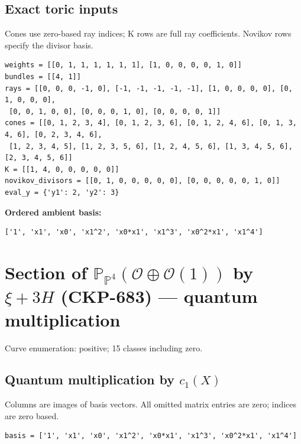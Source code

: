\documentclass[10pt,a4paper]{article}
\begin{document}
\subsection*{Exact toric inputs}
Cones use zero-based ray indices; K rows are full ray coefficients. Novikov rows specify the divisor basis.

\begin{lstlisting}
weights = [[0, 1, 1, 1, 1, 1, 1], [1, 0, 0, 0, 0, 1, 0]]
bundles = [[4, 1]]
rays = [[0, 0, 0, -1, 0], [-1, -1, -1, -1, -1], [1, 0, 0, 0, 0], [0, 1, 0, 0, 0],
 [0, 0, 1, 0, 0], [0, 0, 0, 1, 0], [0, 0, 0, 0, 1]]
cones = [[0, 1, 2, 3, 4], [0, 1, 2, 3, 6], [0, 1, 2, 4, 6], [0, 1, 3, 4, 6], [0, 2, 3, 4, 6],
 [1, 2, 3, 4, 5], [1, 2, 3, 5, 6], [1, 2, 4, 5, 6], [1, 3, 4, 5, 6], [2, 3, 4, 5, 6]]
K = [[1, 4, 0, 0, 0, 0, 0]]
novikov_divisors = [[0, 1, 0, 0, 0, 0, 0], [0, 0, 0, 0, 0, 1, 0]]
eval_y = {'y1': 2, 'y2': 3}
\end{lstlisting}

\textbf{Ordered ambient basis:}
\begin{lstlisting}
['1', 'x1', 'x0', 'x1^2', 'x0*x1', 'x1^3', 'x0^2*x1', 'x1^4']
\end{lstlisting}

\clearpage\section*{Section of $\mathbb P_{\mathbb P^{4}}(\mathcal O\oplus \mathcal O(1))$ by $\xi +3H$ (CKP-683) --- quantum multiplication}

Curve enumeration: positive; 15 classes including zero.
\subsection*{Quantum multiplication by $c_1(X)$}
Columns are images of basis vectors. All omitted matrix entries are zero; indices are zero based.

\begin{lstlisting}
basis = ['1', 'x1', 'x0', 'x1^2', 'x0*x1', 'x1^3', 'x0^2*x1', 'x1^4']
\end{lstlisting}
\end{document}
